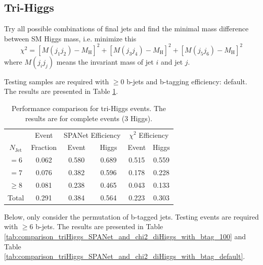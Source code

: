\documentclass[12pt]{article}
\begin{document}
	\subsection{Tri-Higgs}%
	\label{sub:tri_higgs}
		Try all possible combinations of final jets and find the minimal mass difference between SM Higgs mass, i.e. minimize this
		\begin{equation}\label{eq:triHiggs_chisq}
			\chi^2 = [M(j_1j_2)-M_\text{H}]^2 + [M(j_3j_4)-M_\text{H}]^2  + [M(j_5j_6)-M_\text{H}]^2
		\end{equation}
		where $M(j_ij_j)$ means the invariant mass of jet $i$ and jet $j$.

		Testing samples are required with $\ge 0$ b-jets and b-tagging efficiency: default. The results are presented in Table \ref{tab:comparison_triHiggs_SPANet_and_chi2}.

		\begin{table}[htpb]
			\centering
			\caption{Performance comparison for tri-Higgs events. The results are for complete events (3 Higgs).}
			\label{tab:comparison_triHiggs_SPANet_and_chi2}
			\begin{tabular}{c|c|cc|cc}
					  & Event    & \multicolumn{2}{|c|}{SPANet Efficiency} & \multicolumn{2}{|c}{ $\chi^2$ Efficiency} \\
				$N_\text{Jet}$ & Fraction & Event             & Higgs             & Event            & Higgs           \\
				\hline
				$=6$	  &   0.062       &     0.580       &   0.689       &   0.515           &    0.559             \\
				$=7$	  &   0.076       &     0.382       &   0.596       &   0.178           &    0.228            \\
				$\ge 8$	  &   0.081       &     0.238       &   0.465		&   0.043           &    0.133            \\
				Total	  &   0.291       &     0.384       &   0.564       &   0.223           &    0.303            
			\end{tabular}
		\end{table}

		Below, only consider the permutation of b-tagged jets. Testing events are required with $\ge 6$ b-jets. The results are presented in Table \ref{tab:comparison_triHiggs_SPANet_and_chi2_diHiggs_with_btag_100} and Table \ref{tab:comparison_triHiggs_SPANet_and_chi2_diHiggs_with_btag_default}.
\end{document}
